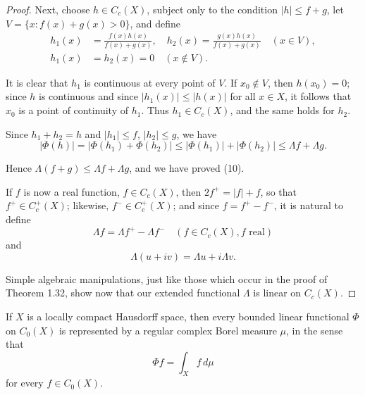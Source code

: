 \begin{proof}
  Next, choose $h \in C_c(X)$, subject only to the condition $|h| \leq f + g$, let $V = \{x : f(x) + g(x) > 0\}$, and define
  \begin{align}
    h_1(x) & = \frac{f(x)h(x)}{f(x) + g(x)}, \quad h_2(x) = \frac{g(x)h(x)}{f(x) + g(x)} \quad (x \in V), \tag{12} \\
    h_1(x) & = h_2(x) = 0 \quad (x \notin V).
  \end{align}

  It is clear that $h_1$ is continuous at every point of $V$.
  If $x_0 \notin V$, then $h(x_0) = 0$; since $h$ is continuous and since $|h_1(x)| \leq |h(x)|$ for all $x \in X$, it follows that $x_0$ is a point of continuity of $h_1$.
  Thus $h_1 \in C_c(X)$, and the same holds for $h_2$.

  Since $h_1 + h_2 = h$ and $|h_1| \leq f$, $|h_2| \leq g$, we have
  \begin{equation}
    |\Phi(h)| = |\Phi(h_1) + \Phi(h_2)| \leq |\Phi(h_1)| + |\Phi(h_2)| \leq \Lambda f + \Lambda g.
  \end{equation}

  Hence $\Lambda(f + g) \leq \Lambda f + \Lambda g$, and we have proved (10).

  If $f$ is now a real function, $f \in C_c(X)$, then $2f^+ = |f| + f$, so that $f^+ \in C_c^+(X)$; likewise, $f^- \in C_c^+(X)$; and since $f = f^+ - f^-$, it is natural to define
  \begin{equation}
    \Lambda f = \Lambda f^+ - \Lambda f^- \quad (f \in C_c(X), f \text{ real}) \tag{13}
  \end{equation}
  and
  \begin{equation}
    \Lambda(u + iv) = \Lambda u + i\Lambda v. \tag{14}
  \end{equation}

  Simple algebraic manipulations, just like those which occur in the proof of Theorem 1.32, show now that our extended functional $\Lambda$ is linear on $C_c(X)$.
\end{proof}

\begin{theorem}[Rudin 6.19]
  \label{integral_rieszMeasure}
  If $X$ is a locally compact Hausdorff space, then every bounded linear functional $\Phi$ on $C_0(X)$ is represented by a regular complex Borel measure $\mu$, in the sense that
  \begin{equation}
    \Phi f = \int_X f \, d\mu \tag{1}
  \end{equation}
  for every $f \in C_0(X)$.
\end{theorem}

